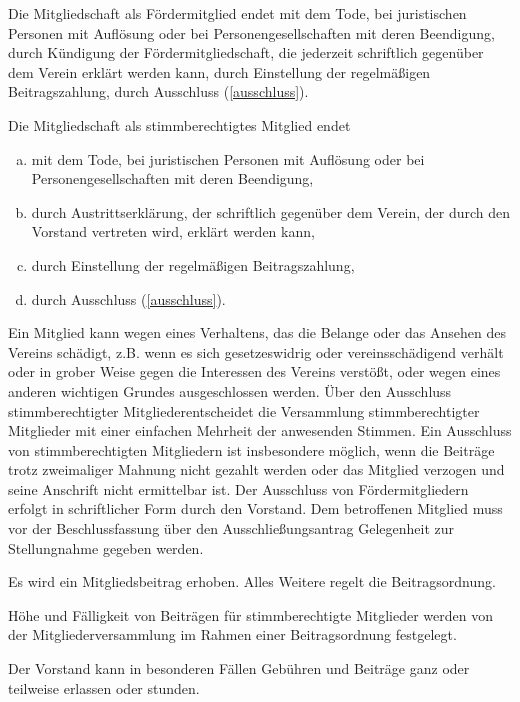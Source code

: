 \begin{contract}

    Die Mitgliedschaft als Fördermitglied endet
    mit dem Tode, bei juristischen Personen mit Auflösung oder bei Personengesellschaften mit deren Beendigung,
    durch Kündigung der Fördermitgliedschaft, die jederzeit schriftlich gegenüber dem Verein erklärt werden kann,
    durch Einstellung der regelmäßigen Beitragszahlung,
    durch Ausschluss (\ref{ausschluss}).

    Die Mitgliedschaft als stimmberechtigtes Mitglied endet
    \begin{enumerate}[(a)]
        \item mit dem Tode, bei juristischen Personen mit Auflösung oder bei Personengesellschaften mit deren Beendigung,
        \item durch Austrittserklärung, der schriftlich gegenüber dem Verein, der durch den Vorstand vertreten wird, erklärt werden kann,
        \item durch Einstellung der regelmäßigen Beitragszahlung,
        \item durch Ausschluss (\ref{ausschluss}).
    \end{enumerate}

    Ein Mitglied kann wegen eines Verhaltens, das die Belange oder das Ansehen des Vereins schädigt, z.B. wenn es sich gesetzeswidrig oder vereinsschädigend verhält oder in grober Weise gegen die Interessen des Vereins verstößt, oder wegen eines anderen wichtigen Grundes ausgeschlossen werden. Über den Ausschluss stimmberechtigter Mitgliederentscheidet die Versammlung stimmberechtigter Mitglieder mit einer einfachen Mehrheit der anwesenden Stimmen. Ein Ausschluss von stimmberechtigten Mitgliedern ist insbesondere möglich, wenn die Beiträge trotz zweimaliger Mahnung nicht gezahlt werden oder das Mitglied verzogen und seine Anschrift nicht ermittelbar ist. Der Ausschluss von Fördermitgliedern erfolgt in schriftlicher Form durch den Vorstand. Dem betroffenen Mitglied muss vor der Beschlussfassung über den Ausschließungsantrag Gelegenheit zur Stellungnahme gegeben werden.
    \label{ausschluss}

    Es wird ein Mitgliedsbeitrag erhoben. Alles Weitere regelt die Beitragsordnung.

    Höhe und Fälligkeit von Beiträgen für stimmberechtigte Mitglieder werden von der Mitgliederversammlung im Rahmen einer Beitragsordnung festgelegt.

    Der Vorstand kann in besonderen Fällen Gebühren und Beiträge ganz oder teilweise erlassen oder stunden.

\end{contract}

